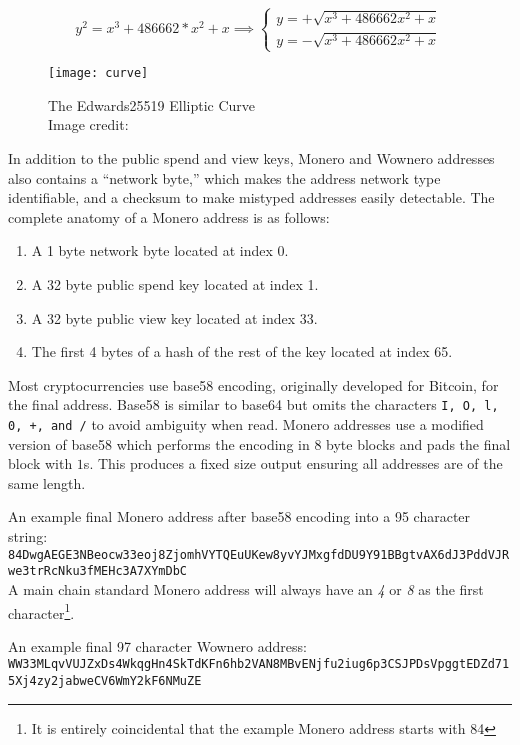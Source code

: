 \[y^2 = x^3+486662*x^2+x \implies \begin{cases}
y = +\sqrt{x^3 + 486662x^2 + x}\\
y = -\sqrt{x^3 + 486662x^2 + x}\end{cases}\]
\begin{figure}[H]
    \centering
    \texttt{[image: curve]}
    \caption{
        The Edwards25519 Elliptic Curve\\
        Image credit: \emph{\authorname}
    }
    \label{fig:curve}
\end{figure}

In addition to the public spend and view keys, Monero and Wownero addresses also contains a ``network byte,'' which makes the address network type identifiable, and a checksum to make mistyped addresses easily detectable\cite{monerodocs_addresses}. The complete anatomy of a Monero address is as follows:\cite{monerodocs_addresses} 
\begin{enumerate}
    \item A 1 byte network byte located at index 0.
    \item A 32 byte public spend key located at index 1.
    \item A 32 byte public view key located at index 33.
    \item The first 4 bytes of a hash of the rest of the key located at index 65.
\end{enumerate}

Most cryptocurrencies use base58 encoding, originally developed for Bitcoin\cite{zero2monero}, for the final address. Base58 is similar to base64 but omits the characters \texttt{I, O, l, 0, +, and /} to avoid ambiguity when read\cite{monerodocs_addresses}. Monero addresses use a modified version of base58 which performs the encoding in 8 byte blocks and pads the final block with $1$s\cite{monerodocs_addresses}. This produces a fixed size output ensuring all addresses are of the same length.

\medskip\noindent
An example final Monero address after base58 encoding into a 95 character string:\\
{\scriptsize\texttt{84DwgAEGE3NBeocw33eoj8ZjomhVYTQEuUKew8yvYJMxgfdDU9Y91BBgtvAX6dJ3PddVJRwe3trRcNku3fMEHc3A7XYmDbC}}\\
A main chain standard Monero address will always have an \emph{4} or \emph{8} as the first character\footnote{It is entirely coincidental that the example Monero address starts with 84}.

\medskip\noindent
An example final 97 character Wownero address:\\
{\scriptsize\texttt{WW33MLqvVUJZxDs4WkqgHn4SkTdKFn6hb2VAN8MBvENjfu2iug6p3CSJPDsVpggtEDZd715Xj4zy2jabweCV6WmY2kF6NMuZE}}\\

